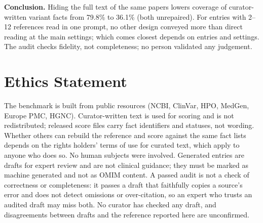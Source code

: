 \documentclass{article} %
\begin{document}
\textbf{Conclusion.} Hiding the full text of the same papers lowers coverage of curator-written variant facts from 79.8\% to 36.1\% (both unrepaired). For entries with 2--12 references read in one prompt, no other design conveyed more than direct reading at the main settings; which comes closest depends on entries and settings. The audit checks fidelity, not completeness; no person validated any judgement.

\section*{Ethics Statement}
The benchmark is built from public resources (NCBI, ClinVar, HPO, MedGen, Europe PMC, HGNC). Curator-written text is used for scoring and is not redistributed; released score files carry fact identifiers and statuses, not wording. Whether others can rebuild the reference and score against the same fact lists depends on the rights holders' terms of use for curated text, which apply to anyone who does so. No human subjects were involved. Generated entries are drafts for expert review and are not clinical guidance; they must be marked as machine generated and not as OMIM content. A passed audit is not a check of correctness or completeness: it passes a draft that faithfully copies a source's error and does not detect omissions or over-citation, so an expert who trusts an audited draft may miss both. No curator has checked any draft, and disagreements between drafts and the reference reported here are unconfirmed.
\end{document}
